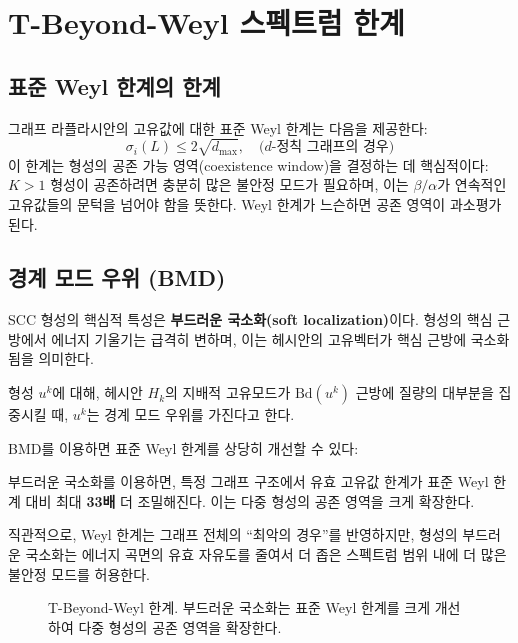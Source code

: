\section{T-Beyond-Weyl 스펙트럼 한계}
\label{sec:beyond-weyl}

\subsection{표준 Weyl 한계의 한계}

그래프 라플라시안의 고유값에 대한 표준 Weyl 한계는 다음을 제공한다:
\begin{equation}
    \sigma_i(L) \leq 2\sqrt{d_{\max}}, \quad \text{($d$-정칙 그래프의 경우)}
    \label{eq:standard-weyl}
\end{equation}
이 한계는 형성의 공존 가능 영역(coexistence window)을 결정하는 데 핵심적이다: $K > 1$ 형성이 공존하려면 충분히 많은 불안정 모드가 필요하며, 이는 $\beta/\alpha$가 연속적인 고유값들의 문턱을 넘어야 함을 뜻한다. Weyl 한계가 느슨하면 공존 영역이 과소평가된다.

\subsection{경계 모드 우위 (BMD)}

SCC 형성의 핵심적 특성은 \textbf{부드러운 국소화(soft localization)}이다. 형성의 핵심 근방에서 에너지 기울기는 급격히 변하며, 이는 헤시안의 고유벡터가 핵심 근방에 국소화됨을 의미한다.

\begin{definition}[경계 모드 우위, BMD]
\label{def:bmd}
형성 $u^k$에 대해, 헤시안 $H_k$의 지배적 고유모드가 $\mathrm{Bd}(u^k)$ 근방에 질량의 대부분을 집중시킬 때, $u^k$는 경계 모드 우위를 가진다고 한다.
\end{definition}

BMD를 이용하면 표준 Weyl 한계를 상당히 개선할 수 있다:

\begin{theorem}
\label{thm:beyond-weyl}
부드러운 국소화를 이용하면, 특정 그래프 구조에서 유효 고유값 한계가 표준 Weyl 한계 대비 최대 \textbf{33배} 더 조밀해진다. 이는 다중 형성의 공존 영역을 크게 확장한다.
\end{theorem}

직관적으로, Weyl 한계는 그래프 전체의 ``최악의 경우''를 반영하지만, 형성의 부드러운 국소화는 에너지 곡면의 유효 자유도를 줄여서 더 좁은 스펙트럼 범위 내에 더 많은 불안정 모드를 허용한다.

\begin{figure}[t]
\centering
{}
\caption{T-Beyond-Weyl 한계. 부드러운 국소화는 표준 Weyl 한계를 크게 개선하여 다중 형성의 공존 영역을 확장한다.}
\label{fig:spectral-bound}
\end{figure}


